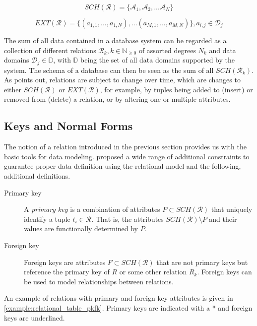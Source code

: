 \begin{equation}
    SCH(\mathcal{R}) = \lbrace \mathcal{A}_1, \mathcal{A}_2, ... \mathcal{A}_N \rbrace
\end{equation}

\begin{equation}
    EXT(\mathcal{R}) = \lbrace (a_{1,1}, ..., a_{1,N}), ... (a_{M,1}, ..., a_{M,N})\rbrace, a_{i,j} \in \mathcal{D}_j 
\end{equation}

The sum of all data contained in a database system can be regarded as a collection of different relations $\mathcal{R}_k, k \in \mathbb{N}_{\geq 0}$ of assorted degrees $N_k$ and data domains $\mathcal{D}_j \in \mathbb{D}$, with $\mathbb{D}$ being the set of all data domains supported by the system. The schema of a database can then be seen as the sum of all $SCH(\mathcal{R}_k)$. As \cite{Codd:1970Relational} points out, relations are subject to change over time, which are changes to either $SCH(\mathcal{R})$ or $EXT(\mathcal{R})$, for example, by tuples being added to (insert) or removed from (delete) a relation, or by altering one or multiple attributes.


\subsection{Keys and Normal Forms}

The notion of a relation introduced in the previous section provides us with the basic tools for data modeling. \cite{Codd:1970Relational} proposed a wide range of additional constraints to guarantee proper data definition using the relational model and the following, additional definitions. 

\begin{description}
    \item[Primary key] A \emph{primary key} is a combination of attributes $P \subset SCH(\mathcal{R})$ that uniquely identify a tuple $t_i \in \mathcal{R}$. That is, the attributes $SCH(\mathcal{R}) \setminus P$ and their values are functionally determined by $P$.
    \item[Foreign key] Foreign keys are attributes $F \subset SCH(\mathcal{R})$ that are not primary keys but reference the primary key of $R$ or some other relation $R_k$. Foreign keys can be used to model relationships between relations.
\end{description}

An example of relations with primary and foreign key attributes is given in \cref{example:relational_table_pkfk}. Primary keys are indicated with a * and foreign keys are underlined.

